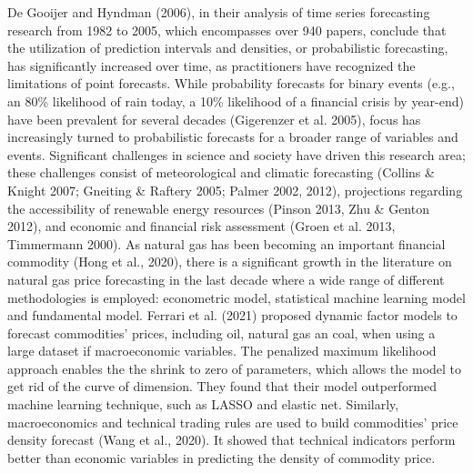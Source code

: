 \documentclass[12pt,a4paper]{article}
\numberwithin{equation}{section}
\begin{document}
De Gooijer and Hyndman (2006), in their analysis of time series forecasting research from 1982 to 2005, which encompasses over 940 papers, conclude that the utilization of prediction intervals and densities, or probabilistic forecasting, has significantly increased over time, as practitioners have recognized the limitations of point forecasts. While probability forecasts for binary events (e.g., an 80\% likelihood of rain today, a 10\% likelihood of a financial crisis by year-end) have been prevalent for several decades (Gigerenzer et al. 2005), focus has increasingly turned to probabilistic forecasts for a broader range of variables and events. Significant challenges in science and society have driven this research area; these challenges consist of meteorological and climatic forecasting (Collins \& Knight 2007; Gneiting \& Raftery 2005; Palmer 2002, 2012), projections regarding the accessibility of renewable energy resources (Pinson 2013, Zhu \& Genton 2012), and economic and financial risk assessment (Groen et al. 2013, Timmermann 2000). As natural gas has been becoming an important financial commodity (Hong et al., 2020), there is a significant growth in the literature on natural gas price forecasting in the last decade where a wide range of different methodologies is employed: econometric model, statistical machine learning model and fundamental model. Ferrari et al. (2021) proposed dynamic factor models to forecast commodities' prices, including oil, natural gas an coal, when using a large dataset if macroeconomic variables. The penalized maximum likelihood approach enables the the shrink to zero of parameters, which allows the model to get rid of the curve of dimension. They found that their model outperformed machine learning technique, such as LASSO and elastic net. Similarly, macroeconomics and technical trading rules are used to build commodities' price density forecast (Wang et al., 2020). It showed that technical indicators perform better than economic variables in predicting the density of commodity price. 
\end{document}
